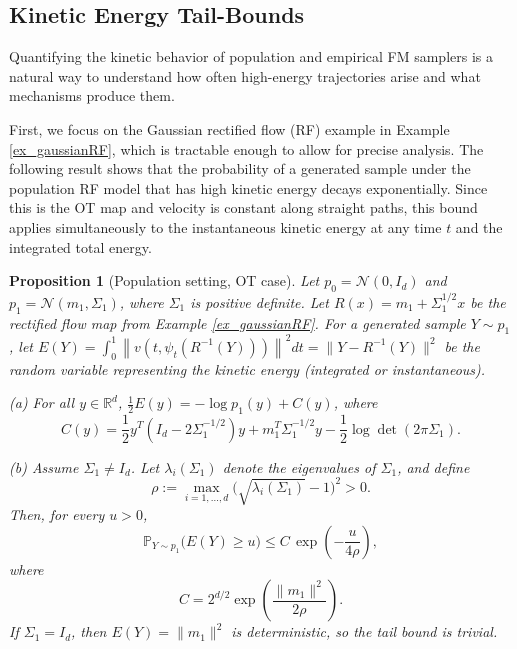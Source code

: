 \documentclass[a4paper,11pt]{article}
\newcommand{\R}{\mathbb{R}}
\theoremstyle{plain}
\newtheorem{propositioninner}[theoreminner]{Proposition}
\theoremstyle{definition}
\newenvironment{proposition}[1][]
  {\begin{mdframed}[style=propositionstyle]\begin{propositioninner}[#1]}
  {\end{propositioninner}\end{mdframed}}
\begin{document}
\subsection{Kinetic Energy Tail-Bounds}
Quantifying the kinetic behavior of population and empirical FM samplers is a natural way to understand how often high-energy trajectories arise and what mechanisms produce them.

First, we focus on the Gaussian rectified flow (RF) example in Example \ref{ex_gaussianRF}, which is tractable enough to allow for   precise analysis. The following result shows that the probability of a generated sample under the population RF model that has high kinetic energy decays exponentially. Since this is the OT map and velocity is constant along straight paths, this bound applies simultaneously to the instantaneous kinetic energy at any time $t$ and the integrated total energy.



\begin{proposition}[Population setting, OT case] \label{prop3}
    Let $p_0 = \mathcal{N}(0, I_d)$ and $p_1 = \mathcal{N}(m_1, \Sigma_1)$, where $\Sigma_1$ is positive definite. Let $R(x) = m_1 + \Sigma_1^{1/2}x$ be the rectified flow map from Example \ref{ex_gaussianRF}. For a generated sample $Y \sim p_1$, let $E(Y)
=
\int_0^1
\left\|
v\left(t,\psi_t(R^{-1}(Y))\right)
\right\|^2dt = \| Y - R^{-1}(Y)\|^2$ be the random variable representing the kinetic energy (integrated or instantaneous).

    (a) For all $y \in \R^d$, $\frac{1}{2} E(y) = - \log p_1(y) + C(y)$, where
        \begin{equation}
        C(y) =  \frac{1}{2} y^T (I_d - 2 \Sigma_1^{-1/2}) y + m_1^T \Sigma_1^{-1/2} y - \frac{1}{2} \log \det(2\pi \Sigma_1).  
    \end{equation}
    
    (b) Assume $\Sigma_1\neq I_d$. Let $\lambda_i(\Sigma_1)$ denote the eigenvalues of $\Sigma_1$, and define
\[
\rho
:=
\max_{i=1,\dots,d}
\bigl(\sqrt{\lambda_i(\Sigma_1)}-1\bigr)^2
>0.
\]
Then, for every $u>0$,
\[
\mathbb P_{Y\sim p_1}\!\bigl(E(Y)\ge u\bigr)
\le
C\,\exp\!\left(-\frac{u}{4\rho}\right),
\]
where
\[
C
=
2^{d/2}\exp\!\left(\frac{\|m_1\|^2}{2\rho}\right).
\]
If \(\Sigma_1=I_d\), then \(E(Y)=\|m_1\|^2\) is deterministic, so the tail bound is trivial.
\end{proposition}
\end{document}
